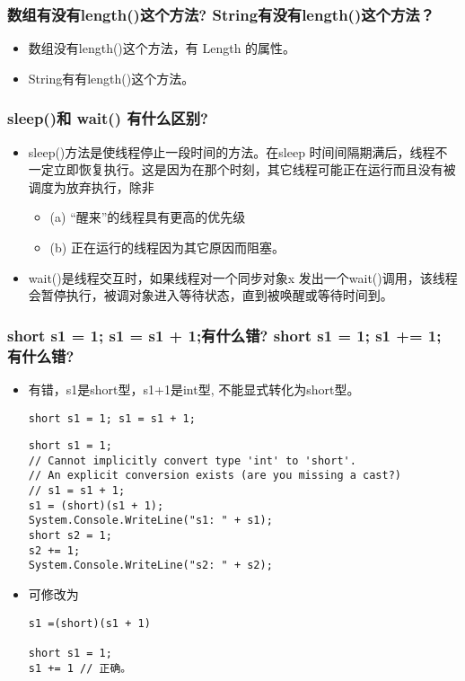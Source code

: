\documentclass[9pt, b5paper]{article}
\begin{document}
\subsubsection{数组有没有length()这个方法? String有没有length()这个方法？}
\label{sec-1-1-47}
\begin{itemize}
\item 数组没有length()这个方法，有 Length 的属性。
\item String有有length()这个方法。
\end{itemize}
\subsubsection{sleep()和 wait() 有什么区别?}
\label{sec-1-1-48}
\begin{itemize}
\item sleep()方法是使线程停止一段时间的方法。在sleep 时间间隔期满后，线程不一定立即恢复执行。这是因为在那个时刻，其它线程可能正在运行而且没有被调度为放弃执行，除非
\begin{itemize}
\item (a) “醒来”的线程具有更高的优先级
\item (b) 正在运行的线程因为其它原因而阻塞。
\end{itemize}
\item wait()是线程交互时，如果线程对一个同步对象x 发出一个wait()调用，该线程会暂停执行，被调对象进入等待状态，直到被唤醒或等待时间到。
\end{itemize}
\subsubsection{short s1 = 1; s1 = s1 + 1;有什么错? short s1 = 1; s1 += 1; 有什么错?}
\label{sec-1-1-49}
\begin{itemize}
\item 有错，s1是short型，s1+1是int型, 不能显式转化为short型。
\begin{verbatim}
short s1 = 1; s1 = s1 + 1;
\end{verbatim}
\begin{verbatim}
short s1 = 1;
// Cannot implicitly convert type 'int' to 'short'.
// An explicit conversion exists (are you missing a cast?)
// s1 = s1 + 1;
s1 = (short)(s1 + 1); 
System.Console.WriteLine("s1: " + s1);
short s2 = 1;
s2 += 1;
System.Console.WriteLine("s2: " + s2);
\end{verbatim}
\item 可修改为
\begin{verbatim}
s1 =(short)(s1 + 1) 

short s1 = 1; 
s1 += 1 // 正确。
\end{verbatim}
\end{itemize}
\end{document}

